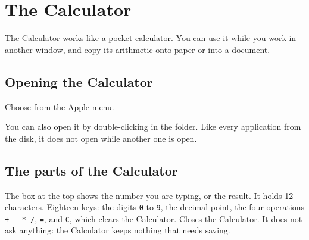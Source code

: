 \chapter{The Calculator}
\label{ch:calculator}

The Calculator works like a pocket calculator.  You can use it while you
work in another window, and copy its arithmetic onto paper or into a
document.

\section{Opening the Calculator}
\begin{TaskSteps}
\Step Choose  from the Apple menu.
\end{TaskSteps}


You can also open it by double-clicking  in the
 folder.  Like every application from the disk, it does not
open while another one is open.

\section{The parts of the Calculator}
The box at the top shows the number you are typing, or
the result.  It holds 12 characters.
Eighteen keys: the digits \texttt{0} to \texttt{9}, the
decimal point, the four operations \texttt{+ - * /}, \texttt{=}, and
\texttt{C}, which clears the Calculator.
Closes the Calculator.  It does not ask anything: the
Calculator keeps nothing that needs saving.

